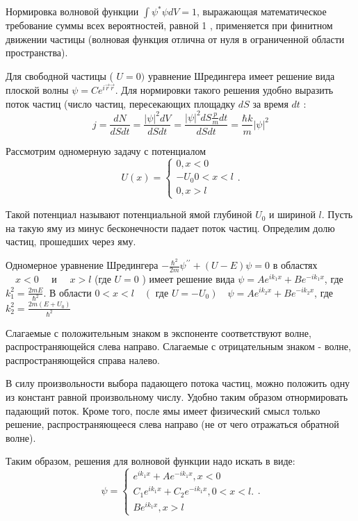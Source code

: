 \documentclass[a4paper, 12pt]{article}%
\begin{document}
	Нормировка волновой функции $\int \psi^* \psi d V=1$, выражающая математическое требование суммы всех вероятностей, равной 1 , применяется при финитном движении частицы (волновая функция отлична от нуля в ограниченной области пространства).
	
	Для свободной частицы ( $U=0)$ уравнение Шредингера имеет решение вида плоской волны $\psi=C e^{i \vec{r} \vec{r}}$. Для нормировки такого решения удобно выразить поток частиц (число частиц, пересекающих площадку $d S$ за время $d t$ :
	$$
	j=\frac{d N}{d S d t}=\frac{|\psi|^2 d V}{d S d t}=\frac{|\psi|^2 d S \frac{p}{m} d t}{d S d t}=\frac{\hbar k}{m}|\psi|^2
	$$
	
	Рассмотрим одномерную задачу с потенциалом
	$$
	U(x)=\left\{\begin{array}{c}
		0, x<0 \\
		-U_0 0<x<l \\
		0, x>l
	\end{array} .\right.
	$$
	
	Такой потенциал называют потенциальной ямой глубиной $U_0$ и шириной $l$.
	Пусть на такую яму из минус бесконечности падает поток частиц. Определим долю частиц, прошедших через яму.
	
	Одномерное уравнение Шредингера $-\frac{\hbar^2}{2 m} \psi^{\prime \prime}+(U-E) \psi=0$ в областях $\quad x<0 \quad$ и $\quad x>l$ (где $U=0$ ) имеет решение вида $\psi=A e^{i k_1 x}+B e^{-i k_1 x}$, где $k_1^2=\frac{2 m E}{\hbar^2}$. В области $0<x<l \quad\left(\right.$ где $\left.U=-U_0\right) \quad \psi=A e^{i k_2 x}+B e^{-i k_2 x}$, где $k_2^2=\frac{2 m\left(E+U_0\right)}{\hbar^2}$
	
	Слагаемые с положительным знаком в экспоненте соответствуют волне, распространяющейся слева направо. Слагаемые с отрицательным знаком - волне, распространяющейся справа налево.
	
	В силу произвольности выбора падающего потока частиц, можно положить одну из констант равной произвольному числу. Удобно таким образом отнормировать падающий поток. Кроме того, после ямы имеет физический смысл только решение, распространяющееся слева направо (не от чего отражаться обратной волне).
	
	Таким образом, решения для волновой функции надо искать в виде:
	$$
	\psi=\left\{\begin{array}{c}
		e^{i k_1 x}+A e^{-i k_1 x}, x<0 \\
		C_1 e^{i k_1 x}+C_2 e^{-i k_1 x}, 0<x<l . \\
		B e^{i k_1 x}, x>l
	\end{array} .\right.
	$$
	
\end{document}
